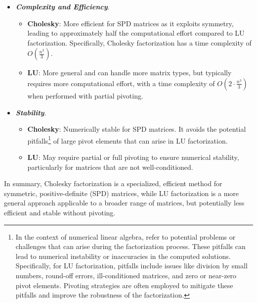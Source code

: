 \begin{enumerate}[label=\textcolor{Green3}{\textbf{\arabic*.}}]
\begin{itemize}
        \item \textbf{\emph{Complexity and Efficiency}}.
        \begin{itemize}
            \item \textbf{Cholesky}: More efficient for SPD matrices as it exploits symmetry, leading to approximately half the computational effort compared to LU factorization. Specifically, Cholesky factorization has a time complexity of $O\left(\frac{n^{3}}{3}\right)$.
            \item \textbf{LU}: More general and can handle more matrix types, but typically requires more computational effort, with a time complexity of $O\left(2 \cdot \frac{n^{3}}{3}\right)$ when performed with partial pivoting.
        \end{itemize}

        \item \textbf{\emph{Stability}}.
        \begin{itemize}
            \item \textbf{Cholesky}: Numerically stable for SPD matrices. It avoids the potential pitfalls\footnote{%
                In the context of numerical linear algebra,  refer to potential problems or challenges that can arise during the factorization process. These pitfalls can lead to numerical instability or inaccuracies in the computed solutions. Specifically, for LU factorization, pitfalls include issues like division by small numbers, round-off errors, ill-conditioned matrices, and zero or near-zero pivot elements. Pivoting strategies are often employed to mitigate these pitfalls and improve the robustness of the factorization.
            } of large pivot elements that can arise in LU factorization.
            \item \textbf{LU}: May require partial or full pivoting to ensure numerical stability, particularly for matrices that are not well-conditioned.
        \end{itemize}
    \end{itemize}
    In summary, Cholesky factorization is a specialized, efficient method for symmetric, positive-definite (SPD) matrices, while LU factorization is a more general approach applicable to a broader range of matrices, but potentially less efficient and stable without pivoting.
\end{enumerate}


\newpage

